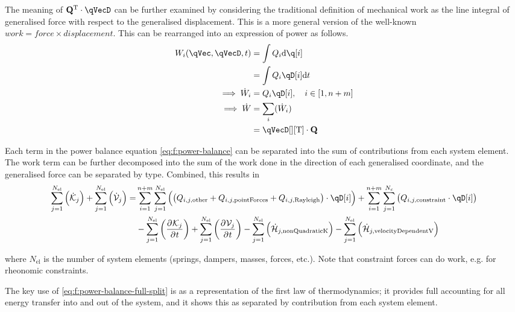 \documentclass[11pt]{article}
\newcommand{\pD}[2]{
    \frac{\partial\mspace{1mu}#1}{\partial\mspace{1mu}#2}
}
\begin{document}
The meaning of $\mathbf{Q}^{\mathrm{T}} \cdot \qVecD$ can be further examined by considering the traditional definition of mechanical work as the line integral of generalised force with respect to the generalised displacement. This is a more general version of the well-known $work=force \times displacement$. This can be rearranged into an expression of power as follows.
\begin{align}
    W_{i}(\qVec, \qVecD, t) &= \int Q_{i} \mathrm{d}\q[i] \nonumber\\
    &= \int Q_{i} \qD[i] \mathrm{d}t \nonumber\\
    \implies \dot{W}_{i} &= Q_{i} \qD[i] ,\quad i\in[1,n+m] \nonumber\\
    \implies \dot{W} &= \sum_{i}(\dot{W}_{i}) \nonumber\\
    &= \qVecD[][\mathrm{T}] \cdot \mathbf{Q}
\end{align}

Each term in the power balance equation \eqref{eq:f:power-balance} can be separated into the sum of contributions from each system element. The work term can be further decomposed into the sum of the work done in the direction of each generalised coordinate, and the generalised force can be separated by type. Combined, this results in
\begin{align} \label{eq:f:power-balance-full-split}
    \sum_{j=1}^{N_\mathrm{el}}\del{\dot{\mathcal{K}}_j}
    + \sum_{j=1}^{N_\mathrm{el}}\del{\dot{\mathcal{V}}_j}
    =& \sum_{i=1}^{n+m}\sum_{j=1}^{N_\mathrm{el}}\del{\del{Q_{i,j,\mathrm{other}}+Q_{i,j,\mathrm{pointForces}}+Q_{i,j,\mathrm{Rayleigh}}} \cdot \qD[i]}
    + \sum_{i=1}^{n+m}\sum_{j=1}^{N_c}\del{Q_{i,j,\mathrm{constraint}} \cdot \qD[i]} \nonumber\\
    &- \sum_{j=1}^{N_\mathrm{el}}\del{\pD{\mathcal{K}_j}{t}}
    + \sum_{j=1}^{N_\mathrm{el}}\del{\pD{\mathcal{V}_j}{t}}
    - \sum_{j=1}^{N_\mathrm{el}}\del{\dot{\mathcal{H}}_{j,\mathrm{nonQuadraticK}}}
    - \sum_{j=1}^{N_\mathrm{el}}\del{\dot{\mathcal{H}}_{j,\mathrm{velocityDependentV}}}
\end{align}

where $N_\mathrm{el}$ is the number of system elements (springs, dampers, masses, forces, etc.). Note that constraint forces can do work, e.g. for rheonomic constraints.

The key use of \eqref{eq:f:power-balance-full-split} is as a representation of the first law of thermodynamics; it provides full accounting for all energy transfer into and out of the system, and it shows this as separated by contribution from each system element.
\end{document}
